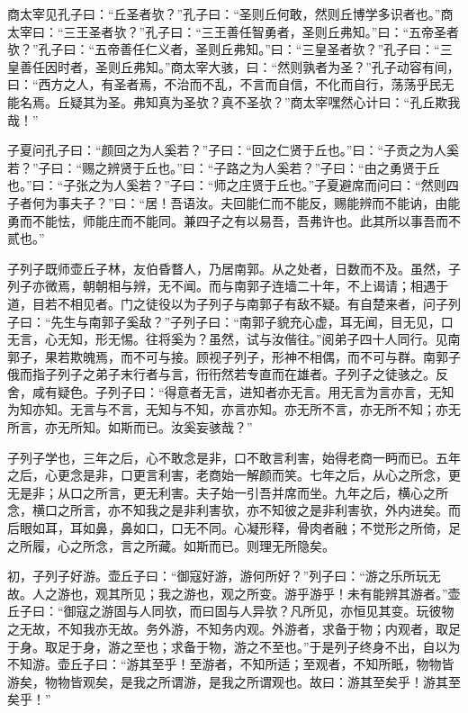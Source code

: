 \documentclass[]{article}
\begin{document}
商太宰见孔子曰：``丘圣者欤？''孔子曰：``圣则丘何敢，然则丘博学多识者也。''商太宰曰：``三王圣者欤？''孔子曰：``三王善任智勇者，圣则丘弗知。''曰：``五帝圣者欤？''孔子曰：``五帝善任仁义者，圣则丘弗知。''曰：``三皇圣者欤？''孔子曰：``三皇善任因时者，圣则丘弗知。''商太宰大骇，曰：``然则孰者为圣？''孔子动容有间，曰：``西方之人，有圣者焉，不治而不乱，不言而自信，不化而自行，荡荡乎民无能名焉。丘疑其为圣。弗知真为圣欤？真不圣欤？''商太宰嘿然心计曰：``孔丘欺我哉！''

子夏问孔子曰：``颜回之为人奚若？''子曰：``回之仁贤于丘也。''曰：``子贡之为人奚若？''子曰：``赐之辨贤于丘也。''曰：``子路之为人奚若？''子曰：``由之勇贤于丘也。''曰：``子张之为人奚若？''子曰：``师之庄贤于丘也。''子夏避席而问曰：``然则四子者何为事夫子？''曰：``居！吾语汝。夫回能仁而不能反，赐能辨而不能讷，由能勇而不能怯，师能庄而不能同。兼四子之有以易吾，吾弗许也。此其所以事吾而不贰也。''

子列子既师壶丘子林，友伯昏瞀人，乃居南郭。从之处者，日数而不及。虽然，子列子亦微焉，朝朝相与辨，无不闻。而与南郭子连墙二十年，不上谒请；相遇于道，目若不相见者。门之徒役以为子列子与南郭子有敌不疑。有自楚来者，问子列子曰：``先生与南郭子奚敌？''子列子曰：``南郭子貌充心虚，耳无闻，目无见，口无言，心无知，形无惕。往将奚为？虽然，试与汝偕往。''阅弟子四十人同行。见南郭子，果若欺魄焉，而不可与接。顾视子列子，形神不相偶，而不可与群。南郭子俄而指子列子之弟子末行者与言，衎衎然若专直而在雄者。子列子之徒骇之。反舍，咸有疑色。子列子曰：``得意者无言，进知者亦无言。用无言为言亦言，无知为知亦知。无言与不言，无知与不知，亦言亦知。亦无所不言，亦无所不知；亦无所言，亦无所知。如斯而已。汝奚妄骇哉？''

子列子学也，三年之后，心不敢念是非，口不敢言利害，始得老商一眄而已。五年之后，心更念是非，口更言利害，老商始一解颜而笑。七年之后，从心之所念，更无是非；从口之所言，更无利害。夫子始一引吾并席而坐。九年之后，横心之所念，横口之所言，亦不知我之是非利害欤，亦不知彼之是非利害欤，外内进矣。而后眼如耳，耳如鼻，鼻如口，口无不同。心凝形释，骨肉者融；不觉形之所倚，足之所履，心之所念，言之所藏。如斯而已。则理无所隐矣。

初，子列子好游。壶丘子曰：``御寇好游，游何所好？''列子曰：``游之乐所玩无故。人之游也，观其所见；我之游也，观之所变。游乎游乎！未有能辨其游者。''壶丘子曰：``御寇之游固与人同欤，而曰固与人异欤？凡所见，亦恒见其变。玩彼物之无故，不知我亦无故。务外游，不知务内观。外游者，求备于物；内观者，取足于身。取足于身，游之至也；求备于物，游之不至也。''于是列子终身不出，自以为不知游。壶丘子曰：``游其至乎！至游者，不知所适；至观者，不知所眂，物物皆游矣，物物皆观矣，是我之所谓游，是我之所谓观也。故曰：游其至矣乎！游其至矣乎！''
\end{document}
